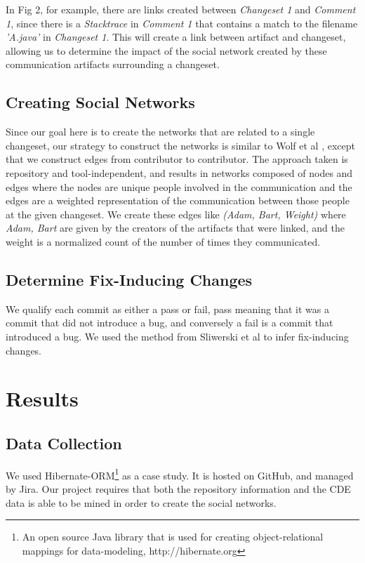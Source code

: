 \documentclass[conference]{IEEEtran}
\begin{document}
In Fig 2, for example, there are links created between \emph{Changeset 1} and \emph{Comment 1}, since there is a \emph{Stacktrace} in \emph{Comment 1} that contains a match to the filename \emph{'A.java'} in \emph{Changeset 1}.  This will create a link between artifact and changeset, allowing us to determine the impact of the social network created by these communication artifacts surrounding a changeset.

\subsection{Creating Social Networks} 
Since our goal here is to create the networks that are related to a single changeset, our strategy to construct the networks is similar to Wolf et al \cite{4721184}, except that we construct edges from contributor to contributor.  The approach taken is repository and tool-independent, and results in networks composed of nodes and edges where the nodes are unique people involved in the communication and the edges are a weighted representation of the communication between those people at the given changeset.  We create these edges like \emph{(Adam, Bart, Weight)} where \emph{Adam, Bart} are given by the creators of the artifacts that were linked, and the weight is a normalized count of the number of times they communicated.   

\subsection{Determine Fix-Inducing Changes}
We qualify each commit as either a pass or fail, pass meaning that it was a commit that did not introduce a bug, and conversely a fail is a commit that introduced a bug.  We used the method from Sliwerski et al \cite{Sliwerski:2005:CIF:1083142.1083147} to infer fix-inducing changes. 

\section{Results}
\subsection{Data Collection}
We used Hibernate-ORM\footnote{An open source Java library that is used for creating object-relational mappings for data-modeling, http://hibernate.org} as a case study.  It is hosted on GitHub, and managed by Jira\footnotemark[2].  Our project requires that both the repository information and the CDE data is able to be mined in order to create the social networks.
\end{document}
